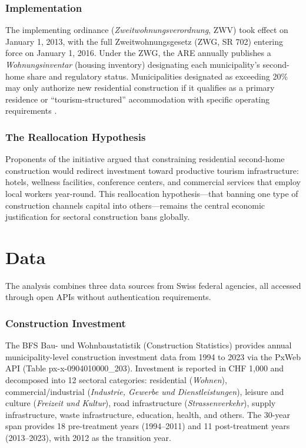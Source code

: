 \documentclass[12pt]{article}
\begin{document}
\subsubsection*{Implementation} The implementing ordinance (\textit{Zweitwohnungsverordnung}, ZWV) took effect on January 1, 2013, with the full Zweitwohnungsgesetz (ZWG, SR 702) entering force on January 1, 2016. Under the ZWG, the ARE annually publishes a \textit{Wohnungsinventar} (housing inventory) designating each municipality's second-home share and regulatory status. Municipalities designated as exceeding 20\% may only authorize new residential construction if it qualifies as a primary residence or ``tourism-structured'' accommodation with specific operating requirements \citep{are2017}.

\subsubsection*{The Reallocation Hypothesis} Proponents of the initiative argued that constraining residential second-home construction would redirect investment toward productive tourism infrastructure: hotels, wellness facilities, conference centers, and commercial services that employ local workers year-round. This reallocation hypothesis---that banning one type of construction channels capital into others---remains the central economic justification for sectoral construction bans globally.

\section{Data}

The analysis combines three data sources from Swiss federal agencies, all accessed through open APIs without authentication requirements.

\subsubsection*{Construction Investment} The BFS Bau- und Wohnbaustatistik (Construction Statistics) provides annual municipality-level construction investment data from 1994 to 2023 via the PxWeb API (Table px-x-0904010000\_203). Investment is reported in CHF 1,000 and decomposed into 12 sectoral categories: residential (\textit{Wohnen}), commercial/industrial (\textit{Industrie, Gewerbe und Dienstleistungen}), leisure and culture (\textit{Freizeit und Kultur}), road infrastructure (\textit{Strassenverkehr}), supply infrastructure, waste infrastructure, education, health, and others. The 30-year span provides 18 pre-treatment years (1994--2011) and 11 post-treatment years (2013--2023), with 2012 as the transition year.
\end{document}
